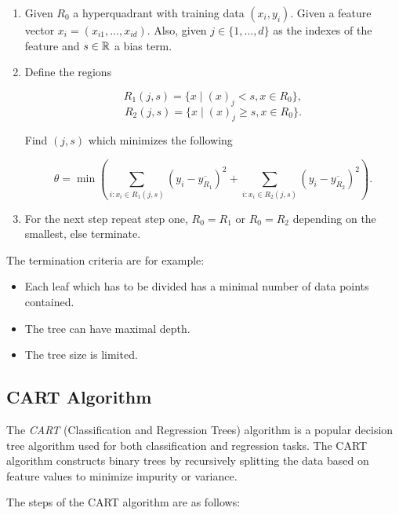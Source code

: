 \begin{enumerate}

	\item Given \(R_0\) a hyperquadrant with training data \((x_i, y_i)\). Given a feature vector \(x_i = (x_{i1}, \dots, x_{id})\). Also, given
	      \(j \in \{1, \dots, d\}\) as the indexes of the feature and \(s \in \mathbb{R}\) a bias term.

	\item Define the regions
	      
		  \[
		      R_1(j,s) = \{x \mid (x)_j < s, x \in R_0\},
	      \]
	      \[
		      R_2(j,s) = \{x \mid (x)_j \ge s, x \in R_0\}.
	      \]

	      Find \((j, s)\) which minimizes the following

	      \[
		      \theta = \min \left(\sum_{i:x_i \in R_1 (j,s)} (y_i - \overline{y_{R_1}})^2 + \sum_{i:x_i \in R_2 (j,s)} (y_i - \overline{y_{R_2}})^2\right).
	      \]

	\item For the next step repeat step one, \(R_0 = R_1\) or \(R_0 = R_2\) depending on the smallest, else terminate.

\end{enumerate}

The termination criteria are for example:

\begin{itemize}
	\item Each leaf which has to be divided has a minimal number of data points contained.

	\item The tree can have maximal depth.

	\item The tree size is limited.
\end{itemize}

\subsection{CART Algorithm}

The \emph{CART} (Classification and Regression Trees) algorithm is a popular decision tree algorithm used for both classification and regression tasks.
The CART algorithm constructs binary trees by recursively splitting the data based on feature values to minimize impurity or variance.

The steps of the CART algorithm are as follows:

